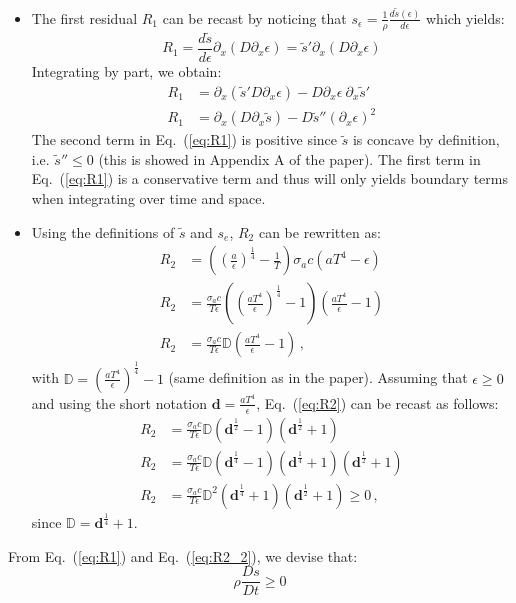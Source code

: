 \documentclass{article}
\newcommand{\eqt}[1]{Eq.~(\ref{#1})}                     %
\begin{document}
\begin{itemize}
%
\item The first residual $R_1$ can be recast by noticing that $s_\epsilon = \frac{1}{\rho} \frac{d\tilde{s}(\epsilon)}{d \epsilon}$ which yields:
%
\begin{equation}
R_1 = \frac{d \tilde{s}}{d \epsilon} \partial_x \left( D \partial_x \epsilon \right) = \tilde{s}' \partial_x \left( D \partial_x \epsilon \right) 
\end{equation}
%
Integrating by part, we obtain:
%
\begin{align}\label{eq:R1}
R_1 &= \partial_x \left( \tilde{s}' D \partial_x \epsilon \right) - D \partial_x \epsilon \ \partial_x \tilde{s}'  \nonumber \\
R_1 &= \partial_x \left( D \partial_x \tilde{s} \right) - D \tilde{s}'' \left( \partial_x \epsilon \right)^2
\end{align}
%
The second term in \eqt{eq:R1} is positive since $\tilde{s}$ is concave by definition, i.e. $\tilde{s}'' \leq 0$ (this is showed in Appendix A of the paper). The first term in \eqt{eq:R1} is a conservative term and thus will only yields boundary terms when integrating over time and space.
%
\item Using the definitions of $\tilde{s}$ and $s_e$, $R_2$ can be rewritten as:
%
\begin{align}\label{eq:R2}
R_2 &= \left( \left( \frac{a}{\epsilon}\right)^\frac{1}{4} - \frac{1}{T} \right) \sigma_a c \left( aT^4 - \epsilon \right) \nonumber \\
R_2 &= \frac{\sigma_a c}{T \epsilon} \left( \left(\frac{aT^4}{\epsilon}\right)^\frac{1}{4} - 1 \right) \left( \frac{a T^4}{\epsilon} -1  \right) \nonumber \\
R_2 &= \frac{\sigma_a c}{T \epsilon} \mathbb{D} \left( \frac{a T^4}{\epsilon} -1  \right) \, ,
\end{align}
%
with $\mathbb{D} = \left(\frac{aT^4}{\epsilon}\right)^\frac{1}{4} - 1$ (same definition as in the paper).
Assuming that $\epsilon \geq 0$ and using the short notation $\mathbf{d} = \frac{a T^4}{\epsilon}$, \eqt{eq:R2} can be recast as follows:
%
\begin{align}\label{eq:R2_2}
R_2 &= \frac{\sigma_a c}{T \epsilon} \mathbb{D} \left( \mathbf{d}^\frac{1}{2}-1 \right) \left( \mathbf{d}^\frac{1}{2} + 1 \right) \nonumber \\
R_2 &= \frac{\sigma_a c}{T \epsilon} \mathbb{D} \left( \mathbf{d}^\frac{1}{4}-1 \right) \left( \mathbf{d}^\frac{1}{4} + 1 \right)  \left( \mathbf{d}^\frac{1}{2} + 1 \right) \nonumber \\
R_2 &= \frac{\sigma_a c}{T \epsilon} \mathbb{D}^2\left( \mathbf{d}^\frac{1}{4} + 1 \right)  \left( \mathbf{d}^\frac{1}{2} + 1 \right) \geq 0 \, ,
\end{align}
%
since $\mathbb{D} = \mathbf{d}^\frac{1}{4} + 1$.
\end{itemize}
%
From \eqt{eq:R1} and \eqt{eq:R2_2}, we devise that:
%
\begin{equation}
\rho \frac{Ds}{Dt} \geq 0 \nonumber
\end{equation}
%
\end{document}
